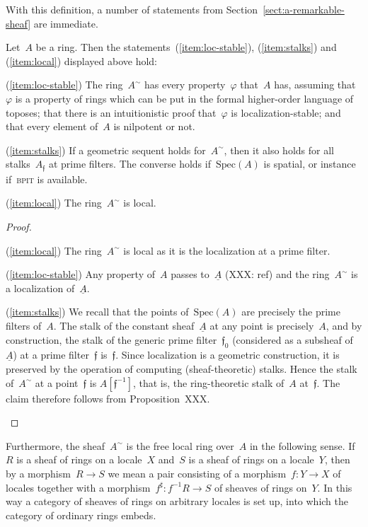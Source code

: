 \documentclass{ws-rv9x6}
\newcommand{\fff}{\mathfrak{f}}
\newcommand{\Spec}{\mathrm{Spec}}
\renewcommand{\_}{\mathpunct{.}}
\newcommand{\?}{\,{:}\,}
\newcommand{\BPIT}{\textsc{bpit}\xspace}
\begin{document}
With this definition, a number of statements from
Section~\ref{sect:a-remarkable-sheaf} are immediate.

\begin{proposition}\label{prop:immediate-consequences}
Let~$A$ be a ring. Then the statements~(\ref{item:loc-stable}), (\ref{item:stalks}) and
(\ref{item:local}) displayed above hold:
\begin{Alphlist}[(D)]
\item[(\ref{item:loc-stable})]
The ring~$A^\sim$ has every property~$\varphi$ that~$A$ has, assuming
that~$\varphi$ is a property of rings which can be put in the formal
higher-order language of toposes; that there is an intuitionistic proof
that~$\varphi$ is localization-stable; and that every element of~$A$ is
nilpotent or not.
\item[(\ref{item:stalks})]
If a geometric sequent holds for~$A^\sim$, then it also holds for all
stalks~$A_\fff$ at prime filters. The converse holds if~$\Spec(A)$ is spatial,
or instance if~\BPIT is available.
\item[(\ref{item:local})] The ring~$A^\sim$ is local.
\end{Alphlist}
\end{proposition}

\begin{proof}
\begin{Alphlist}[(D)]
\item[(\ref{item:local})] The ring~$A^\sim$ is local as it is the
localization at a prime filter.
\item[(\ref{item:loc-stable})] Any property of~$A$ passes to~$\underline{A}$
(XXX: ref) and the ring~$A^\sim$ is a localization of~$\underline{A}$.
\item[(\ref{item:stalks})] We recall that the points of~$\Spec(A)$ are
precisely the prime filters of~$A$. The stalk of the constant
sheaf~$\underline{A}$ at any point is precisely~$A$, and by construction, the
stalk of the generic prime filter~$\fff_0$ (considered as a subsheaf
of~$\underline{A}$) at a prime filter~$\fff$ is~$\fff$. Since localization is a
geometric construction, it is preserved by the operation of computing
(sheaf-theoretic) stalks. Hence the stalk of~$A^\sim$ at a point~$\fff$ is
$A[\fff^{-1}]$, that is, the ring-theoretic stalk of~$A$ at~$\fff$. The claim
therefore follows from Proposition~XXX.\qedhere
\end{Alphlist}
\end{proof}

Furthermore, the sheaf~$A^\sim$ is the free local ring over~$A$ in the
following sense. If~$R$ is a sheaf of rings on a locale~$X$ and~$S$ is a sheaf
of rings on a locale~$Y$, then by a morphism~$R \to S$ we mean a pair
consisting of a morphism~$f : Y \to X$ of locales together with a
morphism~$f^\sharp : f^{-1}R \to S$ of sheaves of rings on~$Y$.
In this way a category of sheaves of rings on arbitrary locales is set up, into
which the category of ordinary rings embeds.
\end{document}
